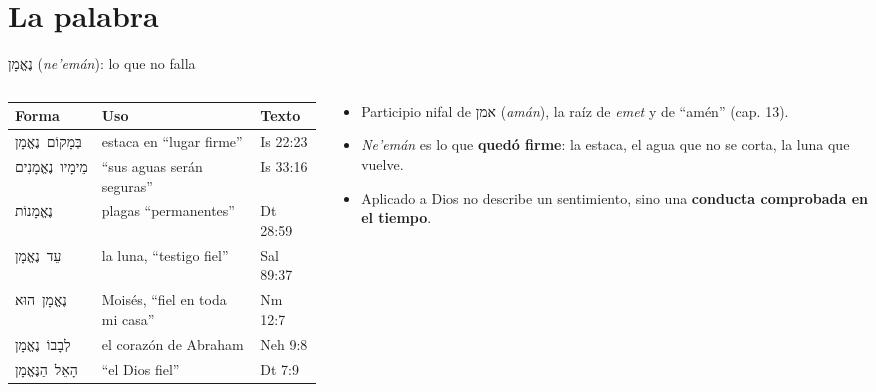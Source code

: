 \documentclass[hyperref={bookmarks=false},aspectratio=169]{beamer}
\newcommand{\heb}[1]{\mbox{\foreignlanguage{hebrew}{#1}}}
\newcommand{\destacar}[1]{\textbf{\textcolor{azul}{#1}}}
\begin{document}
\section{La palabra}

\begin{frame}{\heb{נֶאֱמָן} (\emph{ne'emán}): lo que no falla}
\begin{columns}[t,onlytextwidth]
\begin{column}{0.56\textwidth}
\scriptsize\renewcommand{\arraystretch}{1.12}
\begin{tabular}{@{}>{\RaggedRight\arraybackslash}p{2.0cm}>{\RaggedRight\arraybackslash}p{2.6cm}>{\RaggedRight\arraybackslash}p{1.5cm}@{}}
\toprule
\textbf{Forma} & \textbf{Uso} & \textbf{Texto} \\ \midrule
\heb{בְּמָקוֹם נֶאֱמָן} & estaca en ``lugar firme'' & Is 22:23 \\
\heb{מֵימָיו נֶאֱמָנִים} & ``sus aguas serán seguras'' & Is 33:16 \\
\heb{נֶאֱמָנוֹת} & plagas ``permanentes'' & Dt 28:59 \\
\heb{עֵד\ נֶאֱמָן} & la luna, ``testigo fiel'' & Sal 89:37 \\
\heb{נֶאֱמָן הוּא} & Moisés, ``fiel en toda mi casa'' & Nm 12:7 \\
\heb{לְבָבוֹ נֶאֱמָן} & el corazón de Abraham & Neh 9:8 \\
\heb{הָאֵל הַנֶּאֱמָן} & ``el Dios fiel'' & Dt 7:9 \\
\bottomrule
\end{tabular}
\end{column}
\begin{column}{0.42\textwidth}\small
\begin{itemize}
\item Participio nifal de \heb{אמן} (\emph{amán}), la raíz de \emph{emet} y de ``amén'' (cap. 13).
\item \emph{Ne'emán} es lo que \destacar{quedó firme}: la estaca, el agua que no se corta, la luna que vuelve.
\item Aplicado a Dios no describe un sentimiento, sino una \destacar{conducta comprobada en el tiempo}.
\end{itemize}
\end{column}
\end{columns}
\end{frame}
\end{document}
